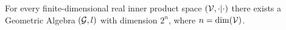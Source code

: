 \begin{theorem}\label{t:existence-dimension}
	For every finite-dimensional real inner product space $(\mathcal{V}, \cdot|\cdot)$ there exists a Geometric Algebra $(\mathcal{G},l)$ with dimension $2^n$, where $n = \dim(\mathcal{V})$.
\end{theorem}
